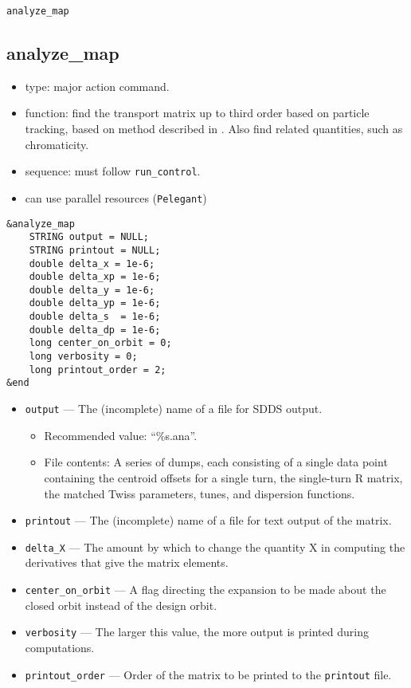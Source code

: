 \documentclass[11pt]{article}
\begin{document}
\newpage
\begin{center}{\Large\verb|analyze_map|}\end{center}
\subsection{analyze\_map \label{subsec:analyzemap}}

\begin{itemize}
\item type: major action command.
\item function: find the transport matrix up to third order based on particle tracking, based on method described
  in \cite{Borland_thesis}.
  Also find related quantities, such as chromaticity.
\item sequence: must follow \verb|run_control|.
\item can use parallel resources (\verb|Pelegant|)
\end{itemize}

\begin{verbatim}
&analyze_map
    STRING output = NULL;
    STRING printout = NULL;
    double delta_x = 1e-6;
    double delta_xp = 1e-6;
    double delta_y = 1e-6;
    double delta_yp = 1e-6;
    double delta_s  = 1e-6;
    double delta_dp = 1e-6;
    long center_on_orbit = 0;
    long verbosity = 0;
    long printout_order = 2;
&end
\end{verbatim}

\begin{itemize}
\item \verb|output| --- The (incomplete) name of a file for SDDS output.
    \begin{itemize}
    \item Recommended value: ``\%s.ana''.
    \item File contents:  A series of dumps, each consisting of a single data point containing
        the centroid offsets for a single turn, the single-turn R matrix, the matched Twiss parameters, tunes, and 
        dispersion functions.
    \end{itemize}
\item \verb|printout| --- The (incomplete) name of a file for text output of the matrix.
\item \verb|delta_X| --- The amount by which to change the quantity X in computing the derivatives that give the matrix elements.
\item \verb|center_on_orbit| --- A flag directing the expansion to be made about the closed orbit instead of the design orbit.
\item \verb|verbosity| --- The larger this value, the more output is printed during computations.
\item \verb|printout_order| --- Order of the matrix to be printed to the \verb|printout| file.
\end{itemize}
\end{document}
